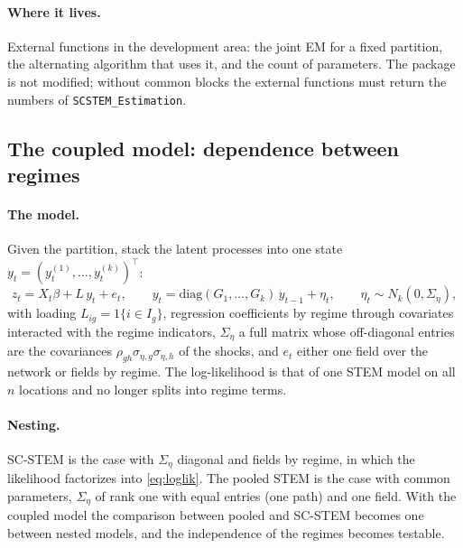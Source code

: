 \documentclass[11pt]{article}
\begin{document}
\paragraph{Where it lives.} External functions in the development area: the joint EM for a fixed partition, the alternating algorithm that uses it, and the count of parameters. The package is not modified; without common blocks the external functions must return the numbers of \texttt{SCSTEM\_Estimation}.

\subsection{The coupled model: dependence between regimes}\label{sec:dev:coupled}

\paragraph{The model.} Given the partition, stack the latent processes into one state $y_t = (y^{(1)}_t, \dots, y^{(k)}_t)^\top$:
\[
  z_t = X_t \beta + L\, y_t + e_t, \qquad y_t = \mathrm{diag}(G_1,\dots,G_k)\, y_{t-1} + \eta_t, \qquad \eta_t \sim N_k(0, \Sigma_\eta),
\]
with loading $L_{ig} = 1\{i \in I_g\}$, regression coefficients by regime through covariates interacted with the regime indicators, $\Sigma_\eta$ a full matrix whose off-diagonal entries are the covariances $\rho_{gh}\sigma_{\eta,g}\sigma_{\eta,h}$ of the shocks, and $e_t$ either one field over the network or fields by regime. The log-likelihood is that of one STEM model on all $n$ locations and no longer splits into regime terms.

\paragraph{Nesting.} SC-STEM is the case with $\Sigma_\eta$ diagonal and fields by regime, in which the likelihood factorizes into \eqref{eq:loglik}. The pooled STEM is the case with common parameters, $\Sigma_\eta$ of rank one with equal entries (one path) and one field. With the coupled model the comparison between pooled and SC-STEM becomes one between nested models, and the independence of the regimes becomes testable.
\end{document}
